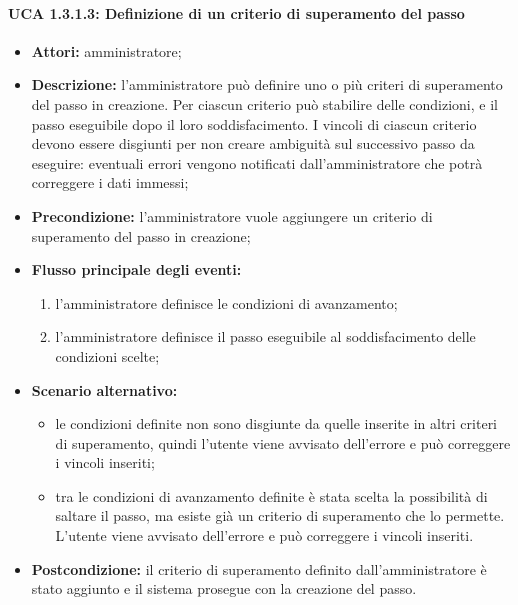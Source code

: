 \paragraph{UCA 1.3.1.3: Definizione di un criterio di superamento del passo}
\begin{itemize}
\item \textbf{Attori:} 
amministratore;
\item \textbf{Descrizione:}
l'amministratore può definire uno o più criteri di superamento del passo in creazione.
Per ciascun criterio può stabilire delle condizioni, e il passo eseguibile dopo il loro soddisfacimento.
I vincoli di ciascun criterio devono essere disgiunti per non creare ambiguità sul successivo passo da eseguire: eventuali errori vengono notificati dall'amministratore che potrà correggere i dati immessi; 
\item \textbf{Precondizione:} 
l'amministratore vuole aggiungere un criterio di superamento del passo in creazione;
\item \textbf{Flusso principale degli eventi:} 
\begin{enumerate}
\item l'amministratore definisce le condizioni di avanzamento;
\item l'amministratore definisce il passo eseguibile al soddisfacimento delle condizioni scelte;
\end{enumerate}
\item \textbf{Scenario alternativo:}
\begin{itemize}
\item le condizioni definite non sono disgiunte da quelle inserite in altri criteri di superamento, quindi l'utente viene avvisato dell'errore e può correggere i vincoli inseriti;
\item tra le condizioni di avanzamento definite è stata scelta la possibilità di saltare il passo, ma esiste già un criterio di superamento che lo permette. L'utente viene avvisato dell'errore e può correggere i vincoli inseriti.
\end{itemize}
\item \textbf{Postcondizione:}
il criterio di superamento definito dall'amministratore è stato aggiunto e il sistema prosegue con la creazione del passo.
\end{itemize}

